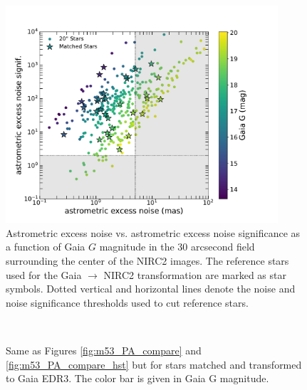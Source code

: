 \documentclass[]{spie}  %
\begin{document}
\begin{figure}[!h]
 \centering
 \includegraphics[width=0.9\textwidth]{airopa/Figures/M53_aen.pdf}
 \caption{\footnotesize Astrometric excess noise vs. astrometric excess noise significance as a function of Gaia $G$ magnitude in the 30 arcsecond field surrounding the center of the NIRC2 images. The reference stars used for the Gaia $\rightarrow$ NIRC2 transformation are marked as star symbols. Dotted vertical and horizontal lines denote the noise and noise significance thresholds used to cut reference stars.\label{fig:m53_aen}}
\end{figure}

\begin{figure}[!h]
  \centering
  \\
  \hspace{-1cm}
  \caption{Same as Figures \ref{fig:m53_PA_compare} and \ref{fig:m53_PA_compare_hst} but for stars matched and transformed to Gaia EDR3. The color bar is given in Gaia G magnitude.} \label{fig:m53_PA_compare_gaia}
\end{figure}
\end{document}
